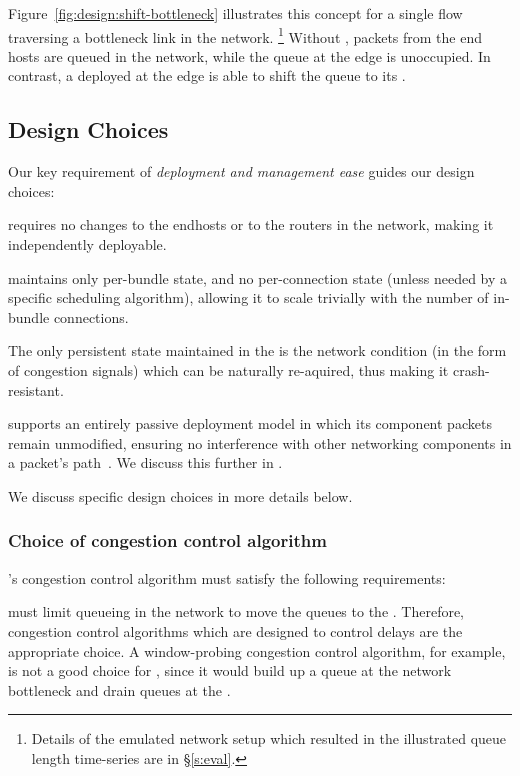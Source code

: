 Figure~\ref{fig:design:shift-bottleneck} illustrates this concept for a single flow traversing a bottleneck link in the network.
\footnote{Details of the emulated network setup which resulted in the illustrated queue length time-series are in \S\ref{s:eval}.} 
Without \name, packets from the end hosts are queued in the network, while the queue at the edge is unoccupied. 
In contrast, a \name deployed at the edge is able to shift the queue to its \inbox.

\subsection{Design Choices}

Our key requirement of \emph{deployment and management ease} guides our design choices:

 \name requires no changes to the endhosts or to the routers in the network, making it independently deployable. 

 \name maintains only per-bundle state, and no per-connection state (unless needed by a specific scheduling algorithm), allowing it to scale trivially with the number of in-bundle connections. 

 The only persistent state maintained in the \name is the network condition (in the form of congestion signals) which can be naturally re-aquired, thus making it crash-resistant. 

 \name supports an entirely passive deployment model in which its component packets remain unmodified, 
ensuring no interference with other networking components in a packet's path~\cite{mboxbadness, ipoptions, quic}. We discuss this further in .

\vspace{5pt}
\noindent We discuss specific design choices in more details below. 

\subsubsection{Choice of congestion control algorithm}
\name's congestion control algorithm must satisfy the following requirements: 

 \name must limit queueing in the network to move the queues to the \inbox. Therefore, congestion control algorithms which are designed to control delays are the appropriate choice. 
A window-probing congestion control algorithm, for example, is not a good choice for \name, since it would build up a queue at the network bottleneck and drain queues at the \inbox.

